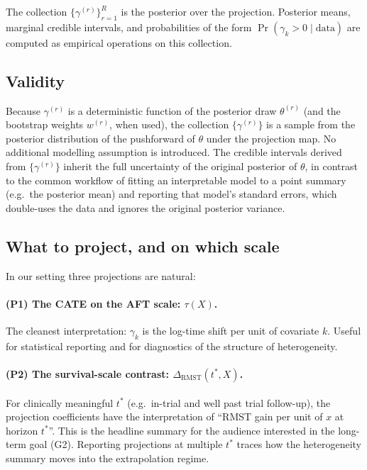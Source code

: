 \documentclass[11pt]{article}
\newcommand{\X}{X}
\newcommand{\tauf}{\tau}
\newcommand{\RMST}{\mathrm{RMST}}
\begin{document}
The collection $\{\gamma^{(r)}\}_{r=1}^{R}$ is the posterior over the
projection. Posterior means, marginal credible intervals, and probabilities
of the form $\Pr(\gamma_{k} > 0 \mid \text{data})$ are computed as empirical
operations on this collection.

\subsection{Validity}

Because $\gamma^{(r)}$ is a deterministic function of the posterior draw
$\theta^{(r)}$ (and the bootstrap weights $w^{(r)}$, when used), the
collection $\{\gamma^{(r)}\}$ is a sample from the posterior distribution of
the pushforward of $\theta$ under the projection map. No additional
modelling assumption is introduced. The credible intervals derived from
$\{\gamma^{(r)}\}$ inherit the full uncertainty of the original posterior
of $\theta$, in contrast to the common workflow of fitting an interpretable
model to a point summary (e.g.\ the posterior mean) and reporting that
model's standard errors, which double-uses the data and ignores the
original posterior variance.

\subsection{What to project, and on which scale}

In our setting three projections are natural:

\paragraph{(P1) The CATE on the AFT scale: $\tauf(\X)$.}
The cleanest interpretation: $\gamma_{k}$ is the log-time shift per unit of
covariate $k$. Useful for statistical reporting and for diagnostics of the
structure of heterogeneity.

\paragraph{(P2) The survival-scale contrast: $\Delta_{\RMST}(t^{*}, \X)$.}
For clinically meaningful $t^{*}$ (e.g.\ in-trial and well past trial
follow-up), the projection coefficients have the interpretation of
``RMST gain per unit of $x$ at horizon $t^{*}$''. This is the headline
summary for the audience interested in the long-term goal (G2). Reporting
projections at multiple $t^{*}$ traces how the heterogeneity summary moves
into the extrapolation regime.
\end{document}
